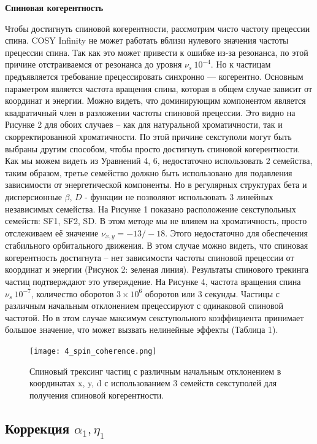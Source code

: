 \textbf{Спиновая когерентность}
\par Чтобы достигнуть спиновой когерентности, рассмотрим чисто частоту прецессии спина. COSY Infinity \cite{cosy} не может работать вблизи нулевого значения частоты прецессии спина. Так как это может привести к ошибке из-за резонанса, по этой причине отстраиваемся от резонанса до уровня $\nu_s~{10}^{-4}$. Но к частицам предъявляется требование прецессировать синхронно — когерентно. 
Основным параметром является частота вращения спина, которая в общем случае зависит от координат и энергии. Можно видеть, что доминирующим компонентом является квадратичный член в разложении частоты спиновой прецессии. Это видно на Рисунке 2 для обоих случаев – как для натуральной хроматичности, так и скорректированной хроматичности. По этой причине секступоли могут быть выбраны другим способом, чтобы просто достигнуть спиновой когерентности.
Как мы можем видеть из Уравнений 4, 6, недостаточно использовать 2 семейства, таким образом, третье семейство должно быть использовано для подавления зависимости от энергетической компоненты. Но в регулярных структурах бета и дисперсионные $\beta$, $D$ - функции не позволяют использовать 3 линейных независимых семейства. На Рисунке 1 показано расположение секступольных семейств: SF1, SF2, SD. В этом методе мы не влияем на хроматичность, просто отслеживаем её значение $\nu_{x,y}=-13/-18$. Этого недостаточно для обеспечения стабильного орбитального движения. В этом случае можно видеть, что спиновая когерентность достигнута – нет зависимости частоты спиновой прецессии от координат и энергии (Рисунок 2: зеленая линия). Результаты спинового трекинга частиц подтверждают это утверждение. На Рисунке 4, частота вращения спина $\nu_s~{10}^{-7}$, количество оборотов $3\times{10}^6$ оборотов или $3$ секунды. Частицы с различным начальным отклонением прецессируют с одинаковой спиновой частотой. Но в этом случае максимум секступольного коэффициента принимает большое значение, что может вызвать нелинейные эффекты (Таблица 1).

\begin{figure}[!h]
  \centering
   \texttt{[image: 4\_spin\_coherence.png]}
   \caption{Спиновый трексинг частиц с различным начальным отклонением в координатах x, y, d с использованием 3 семейств секступолей для получения спиновой когерентности.}
   \label{fig:4_spin_coherence}
\end{figure}

\subsection{Коррекция $\alpha_{1}, \eta_{1}$}\label{sec:EDM/Wien_filter_tracking/correction}

